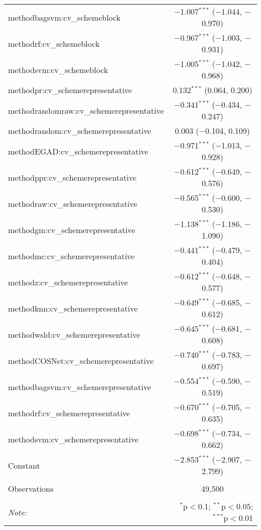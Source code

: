 \begin{table}[!htbp]
\begin{tabular}{@{\extracolsep{5pt}}lc}
  methodbagsvm:cv\_schemeblock & $-$1.007$^{***}$ ($-$1.044, $-$0.970) \\ 
  methodrf:cv\_schemeblock & $-$0.967$^{***}$ ($-$1.003, $-$0.931) \\ 
  methodsvm:cv\_schemeblock & $-$1.005$^{***}$ ($-$1.042, $-$0.968) \\ 
  methodpr:cv\_schemerepresentative & 0.132$^{***}$ (0.064, 0.200) \\ 
  methodrandomraw:cv\_schemerepresentative & $-$0.341$^{***}$ ($-$0.434, $-$0.247) \\ 
  methodrandom:cv\_schemerepresentative & 0.003 ($-$0.104, 0.109) \\ 
  methodEGAD:cv\_schemerepresentative & $-$0.971$^{***}$ ($-$1.013, $-$0.928) \\ 
  methodppr:cv\_schemerepresentative & $-$0.612$^{***}$ ($-$0.649, $-$0.576) \\ 
  methodraw:cv\_schemerepresentative & $-$0.565$^{***}$ ($-$0.600, $-$0.530) \\ 
  methodgm:cv\_schemerepresentative & $-$1.138$^{***}$ ($-$1.186, $-$1.090) \\ 
  methodmc:cv\_schemerepresentative & $-$0.441$^{***}$ ($-$0.479, $-$0.404) \\ 
  methodz:cv\_schemerepresentative & $-$0.612$^{***}$ ($-$0.648, $-$0.577) \\ 
  methodknn:cv\_schemerepresentative & $-$0.649$^{***}$ ($-$0.685, $-$0.612) \\ 
  methodwsld:cv\_schemerepresentative & $-$0.645$^{***}$ ($-$0.681, $-$0.608) \\ 
  methodCOSNet:cv\_schemerepresentative & $-$0.740$^{***}$ ($-$0.783, $-$0.697) \\ 
  methodbagsvm:cv\_schemerepresentative & $-$0.554$^{***}$ ($-$0.590, $-$0.519) \\ 
  methodrf:cv\_schemerepresentative & $-$0.670$^{***}$ ($-$0.705, $-$0.635) \\ 
  methodsvm:cv\_schemerepresentative & $-$0.698$^{***}$ ($-$0.734, $-$0.662) \\ 
  Constant & $-$2.853$^{***}$ ($-$2.907, $-$2.799) \\ 
 \hline \\[-1.8ex] 
Observations & 49,500 \\ 
\hline 
\hline \\[-1.8ex] 
\textit{Note:}  & \multicolumn{1}{r}{$^{*}$p$<$0.1; $^{**}$p$<$0.05; $^{***}$p$<$0.01} \\ 
\end{tabular} 
\end{table} 

